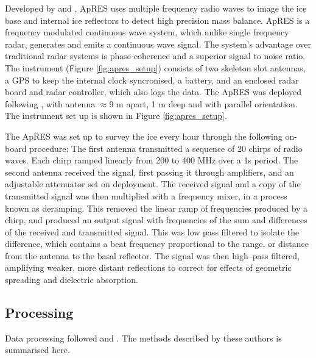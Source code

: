 Developed by \cite{brennan2014phase} and \cite{nicholls2015ground}, ApRES uses multiple frequency radio waves to image the ice base and internal ice reflectors to detect high precision mass balance.
ApRES is a frequency modulated continuous wave system, which unlike single frequency radar, generates and emits a continuous wave signal. The system's advantage over traditional radar systems is phase coherence and a superior signal to noise ratio. The instrument (Figure \ref{fig:apres_setup}) consists of two skeleton slot antennas, a GPS to keep the internal clock syncronised, a battery, and an enclosed radar board and radar controller, which also logs the data. The ApRES was deployed following \cite{nicholls2018apres}, with antenna $\approx 9$ m apart, 1 m deep and with parallel orientation. The instrument set up is shown in Figure \ref{fig:apres_setup}. 

The ApRES was set up to survey the ice every hour through the following on-board procedure:
The first antenna transmitted a sequence of 20 chirps of radio waves. Each chirp ramped linearly from 200 to 400 MHz over a 1s period. The second antenna received the signal,  first passing it through amplifiers, and an adjustable attenuator set on deployment.  %
The received signal and a copy of the transmitted signal was then multiplied with a frequency mixer, in a process known as deramping. This removed the linear ramp of frequencies produced by a chirp, and produced an output signal with frequencies of the sum and differences of the received and transmitted signal. This was low pass filtered to isolate the difference,  which contains a beat frequency proportional to the range, or distance from the antenna to the basal reflector. 
The signal was then high--pass filtered, amplifying weaker, more distant reflections to correct for effects of geometric spreading and dielectric absorption.  




\subsection{Processing}

Data processing followed \cite{brennan2014phase} and \cite{nicholls2015ground}. The methods described by these authors is summarised here.

